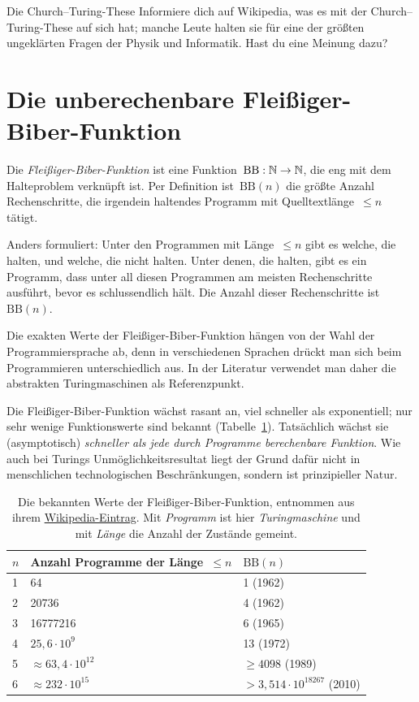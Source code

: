 \documentclass[twoside]{../zirkelblatt1415}
\theoremstyle{definition}
\theoremstyle{plain}
\theoremstyle{remark}
\newcommand{\BB}{\mathrm{BB}}
\begin{document}
\begin{aufgabeShaded}{Die Church--Turing-These}
Informiere dich auf Wikipedia, was es mit der Church--Turing-These auf sich
hat; manche Leute halten sie für eine der größten ungeklärten Fragen der Physik
und Informatik. Hast du eine Meinung dazu?
\end{aufgabeShaded}


\section{Die unberechenbare Fleißiger-Biber-Funktion}

Die \emph{Fleißiger-Biber-Funktion} ist eine Funktion~$\BB : \NN \to \NN$, die
eng mit dem Halteproblem verknüpft ist. Per Definition ist~$\BB(n)$ die größte
Anzahl Rechenschritte, die irgendein haltendes Programm mit
Quelltextlänge~$\leq n$ tätigt.

Anders formuliert: Unter den Programmen mit Länge~$\leq n$ gibt es welche, die
halten, und welche, die nicht halten. Unter denen, die halten, gibt es ein
Programm, dass unter all diesen Programmen am meisten Rechenschritte ausführt,
bevor es schlussendlich hält. Die Anzahl dieser Rechenschritte ist~$\BB(n)$.

Die exakten Werte der Fleißiger-Biber-Funktion hängen von der Wahl der
Programmiersprache ab, denn in verschiedenen Sprachen drückt man sich beim
Programmieren unterschiedlich aus. In der Literatur verwendet man daher die
abstrakten Turingmaschinen als Referenzpunkt.

Die Fleißiger-Biber-Funktion wächst rasant an, viel schneller als exponentiell;
nur sehr wenige Funktionswerte sind bekannt (Tabelle~\ref{tab:bb}). Tatsächlich
wächst sie (asymptotisch) \emph{schneller als jede durch Programme berechenbare
Funktion}. Wie auch bei Turings Unmöglichkeitsresultat liegt der Grund dafür
nicht in menschlichen technologischen Beschränkungen, sondern ist
prinzipieller Natur.

\begin{table}[b]
  \begin{tabular}{@{}lll@{}}
    $n$ & Anzahl Programme der Länge~$\leq n$ & $\BB(n)$ \\\midrule
    1 & 64 & 1 (1962) \\
    2 & 20736 & 4 (1962) \\
    3 & 16777216 & 6 (1965) \\
    4 & $25{,}6 \cdot 10^9$ & 13 (1972) \\
    5 & $\approx 63{,}4 \cdot 10^{12}$ & $\geq 4098$ (1989) \\
    6 & $\approx 232 \cdot 10^{15}$ & $> 3{,}514 \cdot 10^{18267}$ (2010) \\
  \end{tabular}
  \centering
  \caption{\label{tab:bb}Die bekannten Werte der Fleißiger-Biber-Funktion,
  entnommen aus ihrem
  \href{http://de.wikipedia.org/wiki/Fleißiger_Biber}{Wikipedia-Eintrag}. Mit
  \emph{Programm} ist hier \emph{Turingmaschine} und mit \emph{Länge}
  die Anzahl der Zustände gemeint.}
\end{table}
\end{document}
